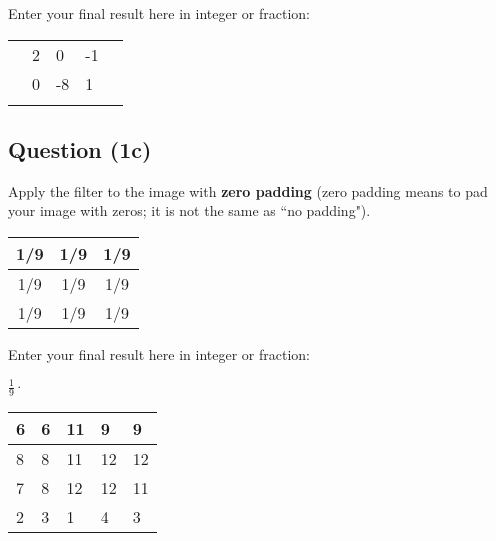 \documentclass[12pt]{article}
\begin{document}
\noindent Enter your final result here in integer or fraction:

\begin{center}
\begin{tabular}{|l|l|l|l|l|}
\hline
 &  &  &  &  \\ \hline
 & 2 & 0 & -1 &  \\ \hline
 & 0 & -8 & 1 &  \\ \hline
 &  &  &  &  \\ \hline
\end{tabular}
\end{center}

\newpage

\subsection*{Question (1c)} Apply the filter to the image with \textbf{zero padding} (zero padding means to pad your image with zeros; it is not the same as ``no padding").
\begin{center}
\begin{tabular}{|c|c|c|}
\hline
1/9  & 1/9 & 1/9 \\ \hline
1/9  & 1/9 & 1/9 \\ \hline
1/9  & 1/9 & 1/9 \\ \hline
\end{tabular}
\end{center}

\noindent Enter your final result here in integer or fraction:

\begin{center}$\frac{1}{9}\cdot$
\begin{tabular}{|l|l|l|l|l|}
\hline
6 &6 & 11 & 9 & 9\\ \hline
8 & 8 & 11 & 12 & 12 \\ \hline
7& 8 & 12 & 12 & 11 \\ \hline
2 & 3 & 1 & 4 & 3 \\ \hline
\end{tabular}
\end{center}
\end{document}
